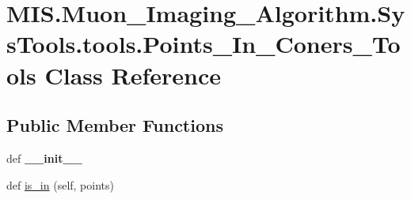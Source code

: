 \hypertarget{classMIS_1_1Muon__Imaging__Algorithm_1_1SysTools_1_1tools_1_1Points__In__Coners__Tools}{}\section{M\+I\+S.\+Muon\+\_\+\+Imaging\+\_\+\+Algorithm.\+Sys\+Tools.\+tools.\+Points\+\_\+\+In\+\_\+\+Coners\+\_\+\+Tools Class Reference}
\label{classMIS_1_1Muon__Imaging__Algorithm_1_1SysTools_1_1tools_1_1Points__In__Coners__Tools}
\subsection*{Public Member Functions}
\begin{DoxyCompactItemize}
\item 
\mbox{\label{classMIS_1_1Muon__Imaging__Algorithm_1_1SysTools_1_1tools_1_1Points__In__Coners__Tools_a0cf0b52ad05b20e66f5f08aa84afd152}} 
def {\bfseries \+\_\+\+\_\+init\+\_\+\+\_\+}
\item 
def \hyperlink{classMIS_1_1Muon__Imaging__Algorithm_1_1SysTools_1_1tools_1_1Points__In__Coners__Tools_ad7eceddba50b2bff5a6bed2cebde950a}{is\+\_\+in} (self, points)
\end{DoxyCompactItemize}

